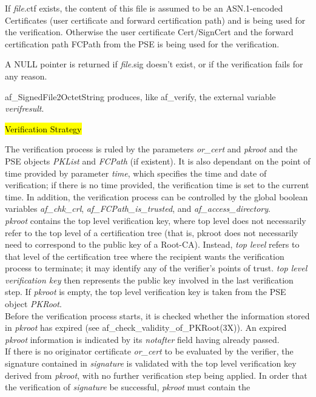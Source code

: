 If {\em file}.ctf exists, the
content of this file is assumed to be an ASN.1-encoded Certificates (user certificate and
forward certification path) and is being used for the verification. Otherwise the
user certificate Cert/SignCert and the forward certification path FCPath from the PSE
is being used for the verification.

A NULL pointer is returned if {\em file}.sig doesn't exist, or if the verification
fails for any reason.
 
af\_SignedFile2OctetString produces, like af\_verify, the external variable {\em verifresult}. 

\hl{Verification Strategy}

The verification process is ruled by the parameters
{\em or\_cert} and {\em pkroot} and the PSE objects {\em PKList} and {\em FCPath} (if
existent). It is also dependant on the point of time provided by parameter {\em time}, which
specifies the time and date of verification; if there
is no time provided, the verification time is set to the current time.
In addition, the verification process can be controlled by the global boolean variables
{\em af\_chk\_crl}, {\em af\_FCPath\_is\_trusted}, and {\em af\_access\_directory}.
\\ [1em]
{\em pkroot} contains the top level verification key, where top 
level does not necessarily refer to the top level of a certification tree 
(that is, pkroot does not necessarily need to correspond to the
public key of a Root-CA). Instead, {\em top level} refers to that level 
of the certification tree where the recipient wants the verification 
process to terminate; it may identify any of the verifier's points of trust.
{\em top level verification key} then represents the 
public key involved in the last verification step.
If {\em pkroot} is empty, the top level verification key is 
taken from the PSE object {\em PKRoot}.
\\ [1em]
Before the verification process starts, it is checked whether the information stored
in {\em pkroot} has expired (see af\_check\_validity\_of\_PKRoot(3X)). An expired
{\em pkroot} information is indicated by its {\em notafter} field having already
passed.
\\ [1em]
If there is no originator certificate {\em or\_cert} to be evaluated 
by the verifier, the signature contained in {\em signature} is 
validated with the top level verification key derived from {\em pkroot}, 
with no further verification step being applied. In order that the 
verification of {\em signature} be successful, {\em pkroot} must contain the 
